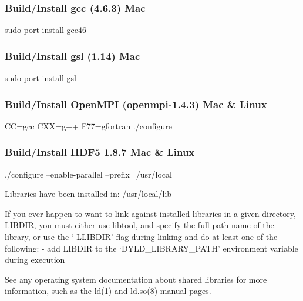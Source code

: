 \subsubsection{Build/Install gcc (4.6.3) Mac}

\begin{footnotesize}
\begin{example}
sudo port install gcc46
\end{example}
\end{footnotesize}

\subsubsection{Build/Install gsl (1.14) Mac}
\begin{footnotesize}
\begin{example}
sudo port install gsl
\end{example}
\end{footnotesize}

\subsubsection{Build/Install OpenMPI (openmpi-1.4.3) Mac \& Linux}
\begin{footnotesize}
\begin{example}
CC=gcc CXX=g++ F77=gfortran ./configure
\end{example}
\end{footnotesize}

\subsubsection{Build/Install HDF5 1.8.7 Mac \& Linux}
\begin{footnotesize}
\begin{example}
./configure --enable-parallel --prefix=/usr/local

Libraries have been installed in:
   /usr/local/lib

If you ever happen to want to link against installed libraries
in a given directory, LIBDIR, you must either use libtool, and
specify the full path name of the library, or use the `-LLIBDIR'
flag during linking and do at least one of the following:
   - add LIBDIR to the `DYLD_LIBRARY_PATH' environment variable
     during execution

See any operating system documentation about shared libraries
for more information, such as the ld(1) and ld.so(8) manual
pages.
\end{example}
\end{footnotesize}

